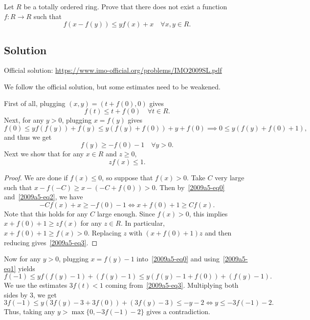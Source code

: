 Let $R$ be a totally ordered ring.
Prove that there does not exist a function $f : R \to R$ such that
\[ f(x - f(y)) \leq y f(x) + x \quad \forall x, y \in R. \tag{*}\label{2009a5-eq0} \]



\subsection*{Solution}

Official solution: \url{https://www.imo-official.org/problems/IMO2009SL.pdf}

We follow the official solution, but some estimates need to be weakened.

First of all, plugging $(x, y) = (t + f(0), 0)$ gives
\[ f(t) \leq t + f(0) \quad \forall t \in R. \tag{1}\label{2009a5-eq1} \]
Next, for any $y > 0$, plugging $x = f(y)$ gives
\[ f(0) \leq y f(f(y)) + f(y) \leq y (f(y) + f(0)) + y + f(0) \implies 0 \leq y (f(y) + f(0) + 1), \]
    and thus we get
\[ f(y) \geq -f(0) - 1 \quad \forall y > 0. \tag{2}\label{2009a5-eq2} \]
Next we show that for any $x \in R$ and $z \geq 0$,
\[ z f(x) \leq 1. \tag{3}\label{2009a5-eq3} \]

\begin{proof}
We are done if $f(x) \leq 0$, so suppose that $f(x) > 0$.
Take $C$ very large such that $x - f(-C) \geq x - (-C + f(0)) > 0$.
Then by~\eqref{2009a5-eq0} and~\eqref{2009a5-eq2}, we have
\[ -C f(x) + x \geq -f(0) - 1 \iff x + f(0) + 1 \geq C f(x). \]
Note that this holds for any $C$ large enough.
Since $f(x) > 0$, this implies $x + f(0) + 1 \geq z f(x)$ for any $z \in R$.
In particular, $x + f(0) + 1 \geq f(x) > 0$.
Replacing $z$ with $(x + f(0) + 1) z$ and then reducing gives~\eqref{2009a5-eq3}.
\end{proof}

Now for any $y > 0$, plugging $x = f(y) - 1$ into~\eqref{2009a5-eq0} and using~\eqref{2009a5-eq1} yields
\[ f(-1) \leq y f(f(y) - 1) + (f(y) - 1) \leq y (f(y) - 1 + f(0)) + (f(y) - 1). \]
We use the estimates $3 f(t) < 1$ coming from~\eqref{2009a5-eq3}.
Multiplying both sides by $3$, we get
\[ 3 f(-1) \leq y (3f(y) - 3 + 3 f(0)) + (3f(y) - 3) \leq -y - 2 \iff y \leq -3 f(-1) - 2. \]
Thus, taking any $y > \max\{0, -3 f(-1) - 2\}$ gives a contradiction.
